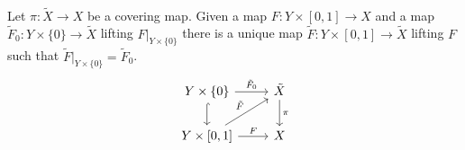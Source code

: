 \begin{theorem}
\label{thm:homotopy lifting property}
\textup{\cite[Thm~3.23]{Warner1983}\cite[Thm~1.7(c)]{Hatcher2002}}\\
Let $\pi : \tilde{X} \to X$ be a covering map.
Given a map $F : Y \times [0,1] \to X$ and a map $\tilde{F}_0 : Y \times \{0\} \to \tilde{X}$ lifting $F|_{Y \times \{0\}}$ there is a unique map $\tilde{F} : Y \times [0,1] \to \tilde{X}$ lifting $F$ such that $\tilde{F}|_{Y \times \{0\}} = \tilde{F}_0$.
\[
\begin{tikzcd}
Y \times \{0\} \arrow[r, "\tilde{F}_0"] \arrow[d, hook] & \tilde{X} \arrow[d, "\pi"] \\
Y \times [0,1] \arrow[r, "F"] \arrow[ru, "\tilde{F}"] & X
\end{tikzcd}
\]
\end{theorem}
